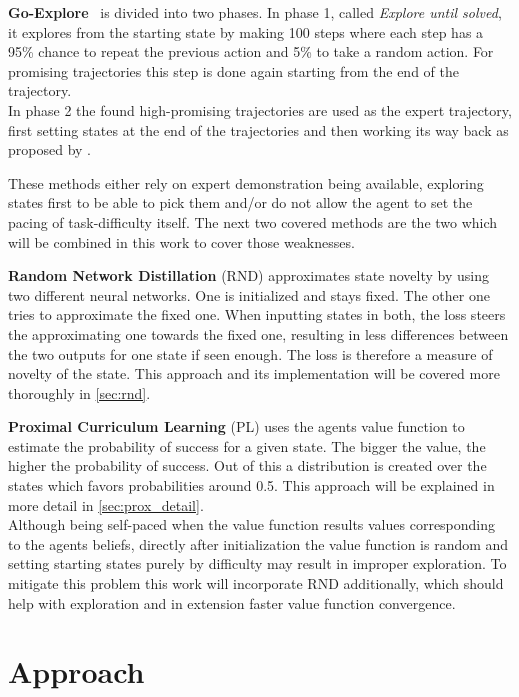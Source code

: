 \documentclass{article}
\begin{document}
\textbf{Go-Explore}~\citep{go_explore} is divided into two phases. In phase 1, called \textit{Explore until solved}, it explores from the starting state by making 100 steps where each step has a 95\% chance to repeat the previous action and 5\% to take a random action. For promising trajectories this step is done again starting from the end of the trajectory.\\
In phase 2 the found high-promising trajectories are used as the expert trajectory, first setting states at the end of the trajectories and then working its way back as proposed by \cite{montezuma_demonstration}.

These methods either rely on expert demonstration being available, exploring states first to be able to pick them and/or do not allow the agent to set the pacing of task-difficulty itself. The next two covered methods are the two which will be combined in this work to cover those weaknesses.

\textbf{Random Network Distillation} (RND) approximates state novelty by using two different neural networks. One is initialized and stays fixed. The other one tries to approximate the fixed one. When inputting states in both, the loss steers the approximating one towards the fixed one, resulting in less differences between the two outputs for one state if seen enough. The loss is therefore a measure of novelty of the state. This approach and its implementation will be covered more thoroughly in \cref{sec:rnd}.

\textbf{Proximal Curriculum Learning} (PL) uses the agents value function to estimate the probability of success for a given state. The bigger the value, the higher the probability of success. Out of this a distribution is created over the states which favors probabilities around 0.5. This approach will be explained in more detail in \cref{sec:prox_detail}. \\
Although being self-paced when the value function results values corresponding to the agents beliefs, directly after initialization the value function is random and setting starting states purely by difficulty may result in improper exploration. To mitigate this problem this work will incorporate RND additionally, which should help with exploration and in extension faster value function convergence.



\section{Approach}
\label{sec:Approach}
\end{document}
